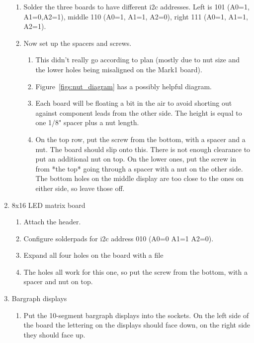 \documentclass[11pt]{article}
\begin{document}
\begin{enumerate}
\begin{enumerate}
		\item Solder the three boards to have different i2c addresses.
			Left is 101 (A0=1, A1=0,A2=1), 
			middle 110 (A0=1, A1=1, A2=0),
			right 111 (A0=1, A1=1, A2=1).
			
		\item Now set up the spacers and screws.
			\begin{enumerate}
			\item This didn't really go according
				to plan (mostly due to nut size
				and the lower holes 
				being misaligned on the Mark1 board).
			\item  Figure~\ref{figs:nut_diagram} has
				a possibly helpful diagram.

			\item Each board will be floating a bit in the air
				to avoid shorting out
			against component leads from the other side.
			The height is equal to one 1/8" spacer plus a
			nut length.  

			\item On the top row, put the screw from the bottom, with
				a spacer and a nut.
				The board should slip onto this.
				There is not enough clearance to put an additional
				nut on top.
				On the lower ones, put the screw in from *the top*
				going through 
				a spacer with a nut on the other side.
				The bottom holes on the middle display are too close
				to the ones
				on either side, so leave those off.
			\end{enumerate}
	\end{enumerate}

\item 8x16 LED matrix board
	\begin{enumerate}

	\item	Attach the header.
	\item   Configure solderpads for i2c address 010
		(A0=0 A1=1 A2=0).
	\item   Expand all four holes on the board with a file
	\item   The holes all work for this one, so put the screw
		from the bottom, with a spacer and nut on top.
	\end{enumerate}


\item Bargraph displays
	\begin{enumerate}

	\item	Put the 10-segment bargraph displays into the sockets.
		On the left side of the board the lettering on the
		displays should
		face down, on the right side they should face up.
	\end{enumerate}


\end{enumerate}
\end{document}
